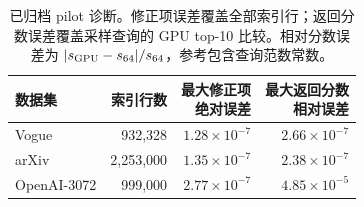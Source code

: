 \begin{table}[tbp]
\centering
\caption[已归档的 pilot 诊断]{已归档 pilot 诊断。修正项误差覆盖全部索引行；返回分数误差覆盖采样查询的 GPU top-10 比较。相对分数误差为 $|s_{\rm GPU}-s_{64}|/s_{64}$，参考包含查询范数常数。}
\label{tab:4-pilot}
\small\setlength{\tabcolsep}{4pt}
\begin{tabular}{@{}lrrr@{}}
\toprule
数据集 & 索引行数 & \shortstack{最大修正项\\绝对误差} & \shortstack{最大返回分数\\相对误差} \\
\midrule
Vogue & 932,328 & $1.28\times10^{-7}$ & $2.66\times10^{-7}$ \\
arXiv & 2,253,000 & $1.35\times10^{-7}$ & $2.38\times10^{-7}$ \\
OpenAI-3072 & 999,000 & $2.77\times10^{-7}$ & $4.85\times10^{-5}$ \\
\bottomrule
\end{tabular}
\end{table}

